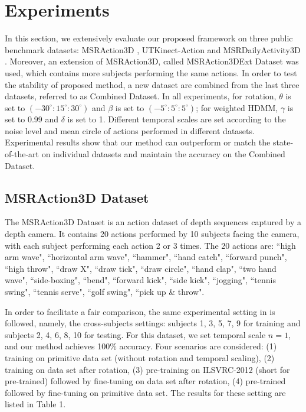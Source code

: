 \documentclass[conference]{IEEEtran}
\begin{document}
\section{Experiments}
In this section, we extensively evaluate our proposed framework on three public benchmark datasets: MSRAction3D \cite{Li2010}, UTKinect-Action \cite{xia2012view} and MSRDailyActivity3D \cite{wang2012mining}. Moreover, an extension of MSRAction3D, called MSRAction3DExt Dataset was used, which contains more subjects performing the same actions. In order to test the stability of proposed method, a new dataset are combined from the last three datasets, referred to as Combined Dataset. In all experiments, for rotation, $\theta$ is set to $(-30^{\circ}:15^{\circ}:30^{\circ})$ and $\beta$ is set to $(-5^{\circ}:5^{\circ}:5^{\circ})$; for weighted HDMM, $\gamma$ is set to 0.99 and $\delta$ is set to 1. Different temporal scales are set according to the noise level and mean circle of actions performed in different datasets. Experimental results show that our method can outperform or match the state-of-the-art on individual datasets and maintain the accuracy on the Combined Dataset.



\subsection{MSRAction3D Dataset}
The MSRAction3D Dataset \cite{Li2010} is an action dataset of depth sequences captured by a depth camera. It contains 20 actions performed by 10 subjects facing the camera, with each subject performing each action 2 or 3 times. The 20 actions are: ``high arm wave", ``horizontal arm wave", ``hammer", ``hand catch", ``forward punch", ``high throw", ``draw X", ``draw tick", ``draw circle", ``hand clap", ``two hand wave", ``side-boxing", ``bend", ``forward kick", ``side kick", ``jogging", ``tennis swing", ``tennis serve", ``golf swing", ``pick up \& throw".

In order to facilitate a fair comparison, the same experimental setting in \cite{wang2012mining} is followed, namely, the cross-subjects settings: subjects 1, 3, 5, 7, 9 for training and subjects 2, 4, 6, 8, 10 for testing. For this dataset, we set temporal scale $n = 1$, and our method achieves 100\% accuracy. Four scenarios are considered: (1) training on primitive data set (without rotation and temporal scaling), (2) training on data set after rotation, (3) pre-training on ILSVRC-2012 (short for pre-trained) followed by fine-tuning on data set after rotation, (4) pre-trained followed by fine-tuning on primitive data set. The results for these setting are listed in Table 1.
\end{document}
